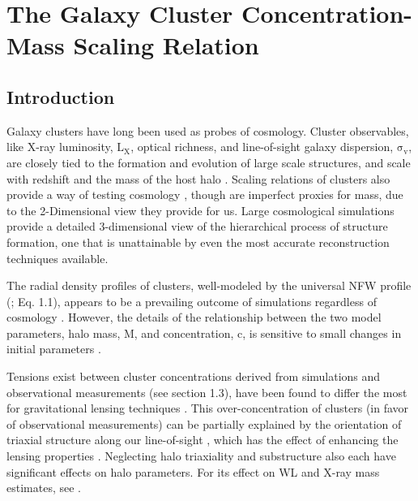 \chapter[The Observed c-M Relation]{The Galaxy Cluster Concentration-Mass Scaling Relation}

\section{Introduction}

Galaxy clusters have long been used as probes of cosmology. Cluster
observables, like X-ray luminosity, $\mathrm{L_{X}}$, optical
richness, and line-of-sight galaxy dispersion,
$\mathrm{\sigma_{v}}$, are closely tied to the formation and evolution of
large scale structures, and scale with redshift and the mass of the
host halo \citep{SE15.3}. Scaling relations of clusters also provide a way of testing
cosmology \citep{VI09.2,RO10.1,MA10.1,MA14.1}, though are imperfect
proxies for mass, due to the 2-Dimensional view they provide for us. Large
cosmological simulations provide a detailed 3-dimensional 
view of the hierarchical process of structure formation, one that is
unattainable by even the most accurate reconstruction techniques available.

The radial density profiles of clusters, well-modeled by the universal NFW
profile (\citealt{NA97.1}; Eq. 1.1), appears to be a prevailing outcome of simulations
regardless of cosmology \citep{NA97.1,CR97.1,KR97.1,BU01.1}. However, the
details of the relationship between the two model parameters, halo mass, M, and
concentration, $\mathrm{c}$, is sensitive to small changes in initial
parameters \citep{MA08.1,CO15.1}.

Tensions exist between cluster concentrations derived from
simulations and observational measurements (see section 1.3),
have been found to differ the most for gravitational lensing techniques
\citep{CO07.1,BR08.1,OG09.1,UM11.2}. This over-concentration of clusters (in
favor of observational measurements) can be partially explained by the orientation of
triaxial structure along our line-of-sight \citep{OG05.1,SE11.1}, which has the
effect of enhancing the lensing properties \citep{HE07.1}. Neglecting halo
triaxiality \citep{CO09.1} and substructure \citep{ME10.2,GI12.1} also each
have significant effects on halo parameters. For its effect on WL and X-ray
mass estimates, see \citet{SE14.2}.

